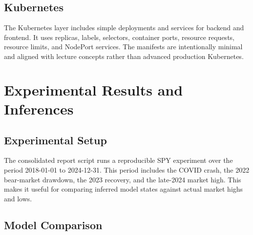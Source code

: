 \documentclass[12pt,a4paper]{report}
\begin{document}
\section{Kubernetes}
The Kubernetes layer includes simple deployments and services for backend and frontend. It uses replicas, labels, selectors, container ports, resource requests, resource limits, and NodePort services. The manifests are intentionally minimal and aligned with lecture concepts rather than advanced production Kubernetes.

\chapter{Experimental Results and Inferences}
\section{Experimental Setup}
The consolidated report script runs a reproducible SPY experiment over the period 2018-01-01 to 2024-12-31. This period includes the COVID crash, the 2022 bear-market drawdown, the 2023 recovery, and the late-2024 market high. This makes it useful for comparing inferred model states against actual market highs and lows.

\section{Model Comparison}
\begin{table}[H]
\centering
\caption{Summary of consolidated SPY model behavior.}
\end{table}
\end{document}
